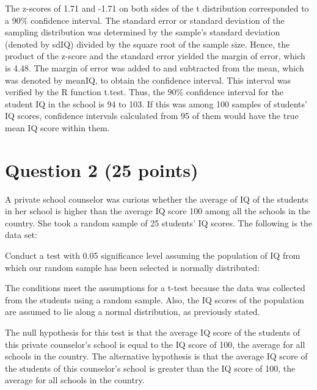 \documentclass[12pt,letterpaper]{article}
\begin{document}
\noindent The z-scores of 1.71 and -1.71 on both sides of the t distribution corresponded to a 90\% confidence interval. The standard error or standard deviation of the sampling distribution was determined by the sample's standard deviation (denoted by sdIQ) divided by the square root of the sample size. Hence, the product of the z-score and the standard error yielded the margin of error, which is 4.48. The margin of error was added to and subtracted from the mean, which was denoted by meanIQ, to obtain the confidence interval. This interval was verified by the R function t.test.
\noindent Thus, the 90\% confidence interval for the student IQ in the school is 94 to 103. If this was among 100 samples of students' IQ scores, confidence intervals calculated from 95 of them would have the true mean IQ score within them.

\vspace{1cm}
\section*{Question 2 (25 points)}
A private school counselor was curious whether  the average of IQ of the students in her school is higher than the average IQ score 100 among all the schools in the country. She took a random sample of 25 students' IQ scores. The following is the data set:
\vspace{.5cm}
  
\vspace{.5cm}

\noindent Conduct a test with 0.05 significance level assuming the population of IQ from which our random sample has been selected is normally distributed:

\vspace{.5cm}

\noindent The conditions meet the assumptions for a t-test because the data was collected from the students using a random sample. Also, the IQ scores of the population are assumed to lie along a normal distribution, as previously stated.

\vspace{.5cm}

\noindent The null hypothesis for this test is that the average IQ score of the students of this private counselor's school is equal to the IQ score of 100, the average for all schools in the country. The alternative hypothesis is that the average IQ score of the students of this counselor's school is greater than the IQ score of 100, the average for all schools in the country.
\end{document}
